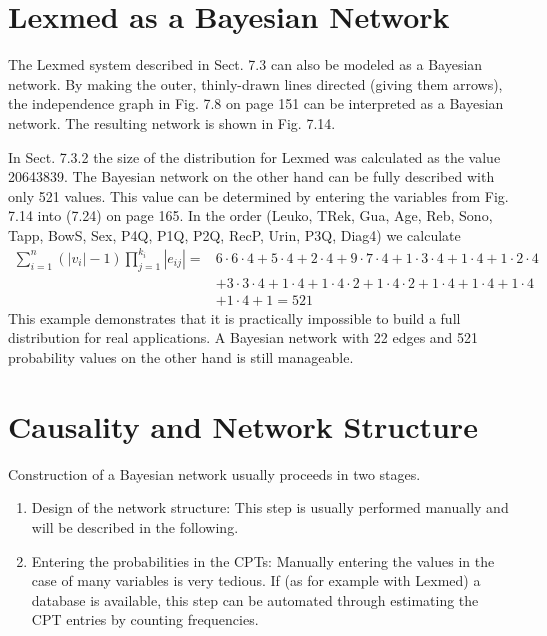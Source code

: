 \documentclass[10pt]{book}
\begin{document}
\section{Lexmed as a Bayesian Network}
The Lexmed system described in Sect. 7.3 can also be modeled as a Bayesian network. By making the outer, thinly-drawn lines directed (giving them arrows), the independence graph in Fig. 7.8 on page 151 can be interpreted as a Bayesian network. The resulting network is shown in Fig. 7.14.

In Sect. 7.3.2 the size of the distribution for Lexmed was calculated as the value 20643839. The Bayesian network on the other hand can be fully described with only 521 values. This value can be determined by entering the variables from Fig. 7.14 into (7.24) on page 165. In the order (Leuko, TRek, Gua, Age, Reb, Sono, Tapp, BowS, Sex, P4Q, P1Q, P2Q, RecP, Urin, P3Q, Diag4) we calculate
\[
\begin{aligned}
\sum_{i=1}^{n}\left(\left|v_{i}\right|-1\right) \prod_{j=1}^{k_{i}}\left|e_{i j}\right|= & 6 \cdot 6 \cdot 4+5 \cdot 4+2 \cdot 4+9 \cdot 7 \cdot 4+1 \cdot 3 \cdot 4+1 \cdot 4+1 \cdot 2 \cdot 4 \\
& +3 \cdot 3 \cdot 4+1 \cdot 4+1 \cdot 4 \cdot 2+1 \cdot 4 \cdot 2+1 \cdot 4+1 \cdot 4+1 \cdot 4 \\
& +1 \cdot 4+1=521
\end{aligned}
\]
This example demonstrates that it is practically impossible to build a full distribution for real applications. A Bayesian network with 22 edges and 521 probability values on the other hand is still manageable.

\section{Causality and Network Structure}
Construction of a Bayesian network usually proceeds in two stages.
\begin{enumerate}
  \item Design of the network structure: This step is usually performed manually and will be described in the following.
  \item Entering the probabilities in the CPTs: Manually entering the values in the case of many variables is very tedious. If (as for example with Lexmed) a database is available, this step can be automated through estimating the CPT entries by counting frequencies.
\end{enumerate}
\end{document}
